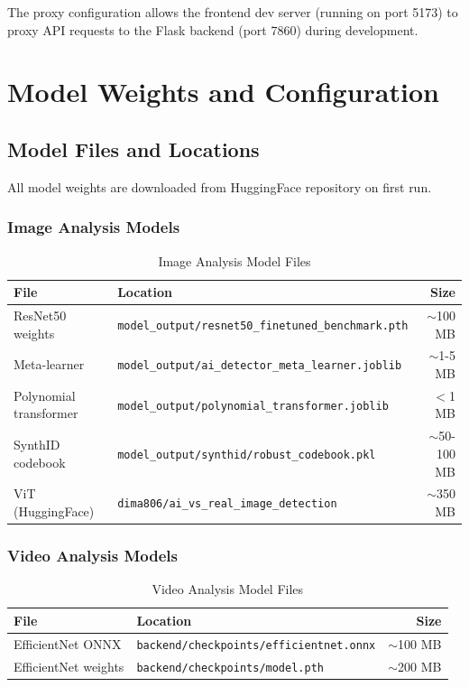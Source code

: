 \documentclass[12pt,a4paper]{book}
\begin{document}
\begin{itemize}
The proxy configuration allows the frontend dev server (running on port 5173) to proxy API requests to the Flask backend (port 7860) during development.

\chapter{Model Weights and Configuration}
\label{ch:models}

\section{Model Files and Locations}

All model weights are downloaded from HuggingFace repository on first run.

\subsection{Image Analysis Models}

\begin{table}[H]
\centering
\captionsetup{justification=centering}
\caption{Image Analysis Model Files}
\begin{tabular}{|l|l|r|}
\hline
\textbf{File} & \textbf{Location} & \textbf{Size} \\
\hline
ResNet50 weights & \texttt{model\_output/resnet50\_finetuned\_benchmark.pth} & $\sim$100 MB \\
\hline
Meta-learner & \texttt{model\_output/ai\_detector\_meta\_learner.joblib} & $\sim$1-5 MB \\
\hline
Polynomial transformer & \texttt{model\_output/polynomial\_transformer.joblib} & $<$1 MB \\
\hline
SynthID codebook & \texttt{model\_output/synthid/robust\_codebook.pkl} & $\sim$50-100 MB \\
\hline
ViT (HuggingFace) & \texttt{dima806/ai\_vs\_real\_image\_detection} & $\sim$350 MB \\
\hline
\end{tabular}
\end{table}

\subsection{Video Analysis Models}

\begin{table}[H]
\centering
\captionsetup{justification=centering}
\caption{Video Analysis Model Files}
\begin{tabular}{|l|l|r|}
\hline
\textbf{File} & \textbf{Location} & \textbf{Size} \\
\hline
EfficientNet ONNX & \texttt{backend/checkpoints/efficientnet.onnx} & $\sim$100 MB \\
\hline
EfficientNet weights & \texttt{backend/checkpoints/model.pth} & $\sim$200 MB \\
\hline
\end{tabular}
\end{table}


\end{itemize}
\end{document}
